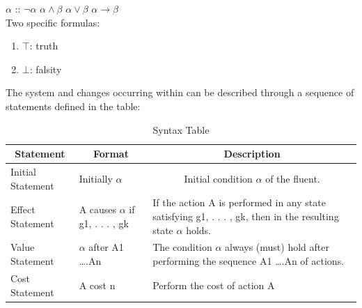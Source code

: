 \documentclass[11pt]{article}
\begin{document}
	$\alpha$ :: $\neg\alpha$ \textbar $\alpha\wedge\beta$ \textbar $\alpha\vee\beta$ \textbar $\alpha\rightarrow\beta$\\
	Two specific formulas:
	\begin{enumerate}
	\item $\top$: truth
	\item $\bot$: falsity
	\end{enumerate}
	The system and changes occurring within can be described through a sequence of statements defined in the table:
	\begin{table}[htbp]
  \centering
    \begin{tabular}{|p{2cm}|p{4cm}|p{9cm}|}
    \hline
    \multicolumn{1}{|c|}{Statement} & \multicolumn{1}{c|}{Format} & \multicolumn{1}{c|}{Description} \\
    \hline
    Initial Statement & Initially $\alpha$ & \multicolumn{1}{c|}{Initial condition $\alpha$ of the fluent.} \\
    \hline
    Effect Statement & A causes $\alpha$ if g1, . . . , gk & If the action A is performed in any state satisfying g1, . . . , gk, then in
    the resulting state $\alpha$ holds. \\
    \hline
    Value Statement & $\alpha$ after A1 ….An & The condition $\alpha$ always (must) hold after performing the sequence A1 ….An of actions. \\
    \hline
    Cost Statement & A cost n & Perform the cost of action A \\
    \hline
    \end{tabular}
    \caption{Syntax Table}
  \label{tab:table01}
\end{table}
\end{document}
